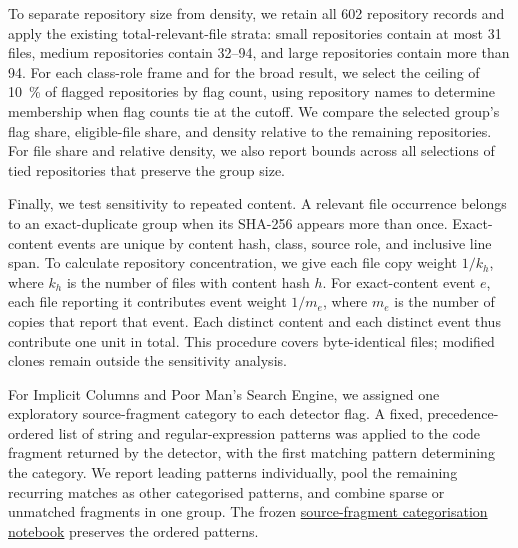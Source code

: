To separate repository size from density, we retain all \num{602} repository records and apply the existing total-relevant-file strata: small repositories contain at most \num{31} files, medium repositories contain \numrange{32}{94}, and large repositories contain more than \num{94}. For each class-role frame and for the broad result, we select the ceiling of \qty{10}{\percent} of flagged repositories by flag count, using repository names to determine membership when flag counts tie at the cutoff. We compare the selected group's flag share, eligible-file share, and density relative to the remaining repositories. For file share and relative density, we also report bounds across all selections of tied repositories that preserve the group size.

Finally, we test sensitivity to repeated content. A relevant file occurrence belongs to an exact-duplicate group when its SHA-256 appears more than once. Exact-content events are unique by content hash, class, source role, and inclusive line span. To calculate repository concentration, we give each file copy weight $1/k_h$, where $k_h$ is the number of files with content hash $h$. For exact-content event $e$, each file reporting it contributes event weight $1/m_e$, where $m_e$ is the number of copies that report that event. Each distinct content and each distinct event thus contribute one unit in total. This procedure covers byte-identical files; modified clones remain outside the sensitivity analysis.

For Implicit Columns and Poor Man's Search Engine, we assigned one exploratory source-fragment category to each detector flag. A fixed, precedence-ordered list of string and regular-expression patterns was applied to the code fragment returned by the detector, with the first matching pattern determining the category. We report leading patterns individually, pool the remaining recurring matches as other categorised patterns, and combine sparse or unmatched fragments in one group. The frozen \href{https://github.com/kristoisberg/masters-thesis/blob/9913a7670fce52b135651f95ff18cd505c61b142/scripts/21-find-frequent-offenders.ipynb}{source-fragment categorisation notebook} preserves the ordered patterns.
